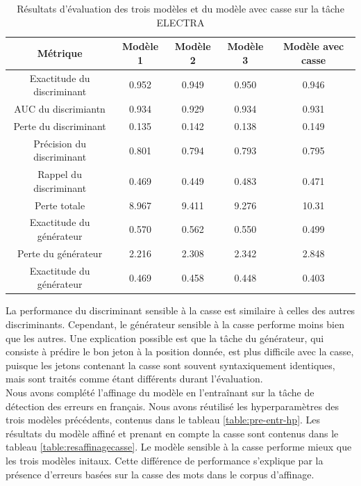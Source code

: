 \documentclass[12pt,twoside,rapport]{dms}
\theoremstyle{definition}
\numberwithin{equation}{section}
\numberwithin{table}{chapter}
\numberwithin{figure}{chapter}
\begin{document}
\begin{table}[h!]
	\centering
	\begin{tabular}{||c | c c c c||}
		\hline
		Métrique                   & Modèle 1 & Modèle 2 & Modèle 3 & Modèle avec casse \\ [0.5ex]
		\hline\hline
		Exactitude du discriminant & 0.952    & 0.949    & 0.950    & 0.946             \\
		AUC du discrimiantn        & 0.934    & 0.929    & 0.934    & 0.931             \\
		Perte du discriminant      & 0.135    & 0.142    & 0.138    & 0.149             \\
		Précision du discriminant  & 0.801    & 0.794    & 0.793    & 0.795             \\
		Rappel du discriminant     & 0.469    & 0.449    & 0.483    & 0.471             \\
		Perte totale               & 8.967    & 9.411    & 9.276    & 10.31             \\
		Exactitude du générateur   & 0.570    & 0.562    & 0.550    & 0.499             \\
		Perte du générateur        & 2.216    & 2.308    & 2.342    & 2.848             \\
		Exactitude du générateur   & 0.469    & 0.458    & 0.448    & 0.403             \\
		\hline
	\end{tabular}
	\caption{Résultats d'évaluation des trois modèles et du modèle avec casse sur la tâche ELECTRA}
	\label{table:respreentrainementaveccasse}
\end{table}

La performance du discriminant sensible à la casse est similaire à celles des
autres discriminants. Cependant, le générateur sensible à la casse performe
moins bien que les autres. Une explication possible est que la tâche du
générateur, qui consiste à prédire le bon jeton à la position donnée, est plus
difficile avec la casse, puisque les jetons contenant la casse sont souvent
syntaxiquement identiques, mais sont traités comme étant différents durant
l'évaluation.\\

Nous avons complété l'affinage du modèle en l'entraînant sur la tâche de
détection des erreurs en français. Nous avons réutilisé les hyperparamètres des
trois modèles précédents, contenus dans le tableau \ref{table:pre-entr-hp}. Les
résultats du modèle affiné et prenant en compte la casse sont contenus dans le
tableau \ref{table:resaffinagecasse}. Le modèle sensible à la casse performe
mieux que les trois modèles initaux. Cette différence de performance s'explique
par la présence d'erreurs basées sur la casse des mots dans le corpus
d'affinage.
\end{document}
